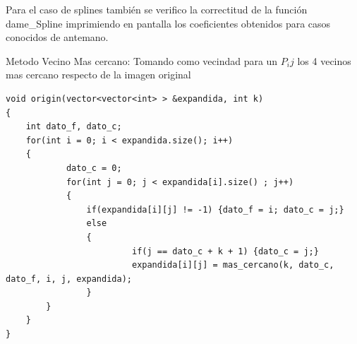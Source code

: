 \documentclass[a4paper]{article}
\begin{document}
Para el caso de splines también se verifico la correctitud de la función dame_Spline imprimiendo en pantalla los coeficientes obtenidos para casos conocidos de antemano.

Metodo Vecino Mas cercano: Tomando como vecindad para un $P_ij$ los 4 vecinos mas cercano respecto de la imagen original 


\begin{verbatim}
void origin(vector<vector<int> > &expandida, int k)
{
    int dato_f, dato_c;
    for(int i = 0; i < expandida.size(); i++)
    {
    	    dato_c = 0;
    	    for(int j = 0; j < expandida[i].size() ; j++)
    	    {
    		    if(expandida[i][j] != -1) {dato_f = i; dato_c = j;}
    		    else
    		    {
    			         if(j == dato_c + k + 1) {dato_c = j;}
    			         expandida[i][j] = mas_cercano(k, dato_c, dato_f, i, j, expandida); 
    	        }
        }
    }
}
\end{verbatim} 
\end{document}

